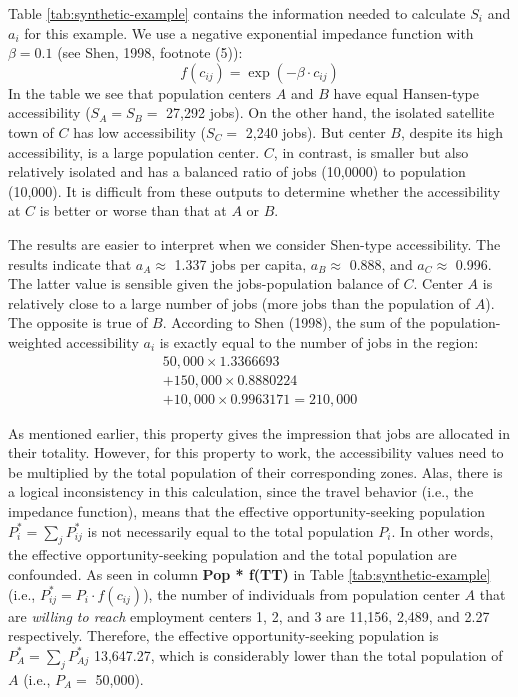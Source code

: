 \documentclass[]{elsarticle} %
\begin{document}
\begin{table}[ht]
\end{table}
 

Table \ref{tab:synthetic-example} contains the information needed to
calculate \(S_i\) and \(a_i\) for this example. We use a negative
exponential impedance function with \(\beta=0.1\) (see Shen, 1998,
footnote (5)): \[
f(c_{ij}) = \exp(-\beta\cdot c_{ij})
\] In the table we see that population centers \(A\) and \(B\) have
equal Hansen-type accessibility (\(S_A = S_B=\) 27,292 jobs). On the
other hand, the isolated satellite town of \(C\) has low accessibility
(\(S_C=\) 2,240 jobs). But center \(B\), despite its high accessibility,
is a large population center. \(C\), in contrast, is smaller but also
relatively isolated and has a balanced ratio of jobs (10,0000) to
population (10,000). It is difficult from these outputs to determine
whether the accessibility at \(C\) is better or worse than that at \(A\)
or \(B\).

The results are easier to interpret when we consider Shen-type
accessibility. The results indicate that \(a_A \approx\) 1.337 jobs per
capita, \(a_B \approx\) 0.888, and \(a_C\approx\) 0.996. The latter
value is sensible given the jobs-population balance of \(C\). Center
\(A\) is relatively close to a large number of jobs (more jobs than the
population of \(A\)). The opposite is true of \(B\). According to Shen
(1998), the sum of the population-weighted accessibility \(a_i\) is
exactly equal to the number of jobs in the region: \[
\begin{array}{l}
50,000\times 1.3366693 \\
+ 150,000 \times 0.8880224 \\
+ 10,000 \times 0.9963171 = 210,000
\end{array}
\]

As mentioned earlier, this property gives the impression that jobs are
allocated in their totality. However, for this property to work, the
accessibility values need to be multiplied by the total population of
their corresponding zones. Alas, there is a logical inconsistency in
this calculation, since the travel behavior (i.e., the impedance
function), means that the effective opportunity-seeking population
\(P_i^* = \sum_j P_{ij}^*\) is not necessarily equal to the total
population \(P_i\). In other words, the effective opportunity-seeking
population and the total population are confounded. As seen in column
\textbf{Pop * f(TT)} in Table \ref{tab:synthetic-example} (i.e.,
\(P_{ij}^* = P_i\cdot f(c_{ij})\)), the number of individuals from
population center \(A\) that are \emph{willing to reach} employment
centers 1, 2, and 3 are 11,156, 2,489, and 2.27 respectively. Therefore,
the effective opportunity-seeking population is
\(P_A^* = \sum_jP_{Aj}^*\) 13,647.27, which is considerably lower than
the total population of \(A\) (i.e., \(P_A=\) 50,000).
\end{document}

